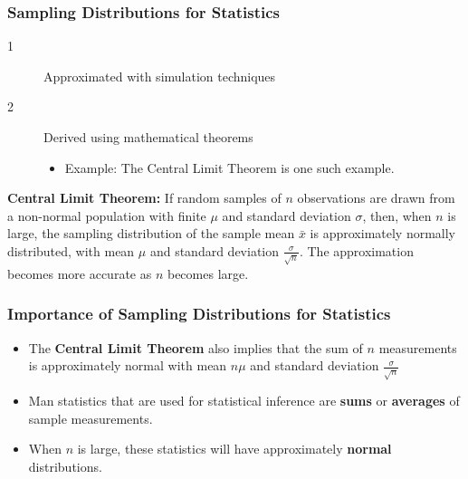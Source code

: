 \documentclass[12pt, letterpaper]{article}
\begin{document}
            \subsubsection{Sampling Distributions for Statistics} 
                \begin{description}
                    \item[1] Approximated with simulation techniques
                    \item[2] Derived using mathematical theorems
                    \begin{itemize}
                        \item Example: The Central Limit Theorem is one such example.
                    \end{itemize}
                \end{description}
                \begin{mdframed}[leftmargin=10pt, rightmargin=10pt]
                    \textbf{Central Limit Theorem:} If random samples of $n$ observations are drawn from a non-normal population with finite $\mu$ and standard deviation $\sigma$, then, when $n$ is large, the sampling distribution of the sample mean $\bar{x}$ is approximately normally distributed, with mean $\mu$ and standard deviation $\frac{\sigma}{\sqrt{n}}$. The approximation becomes more accurate as $n$ becomes large.
                \end{mdframed}
            \subsubsection{Importance of Sampling Distributions for Statistics}
                \begin{itemize}
                    \item The \textbf{Central Limit Theorem} also implies that the sum of $n$ measurements is approximately normal with mean $n\mu$ and standard deviation $\frac{\sigma}{\sqrt{n}}$
                    \item Man statistics that are used for statistical inference are \textbf{sums} or \textbf{averages} of sample measurements.
                    \item When $n$ is large, these statistics will have approximately \textbf{normal} distributions.
                \end{itemize}
\end{document}
